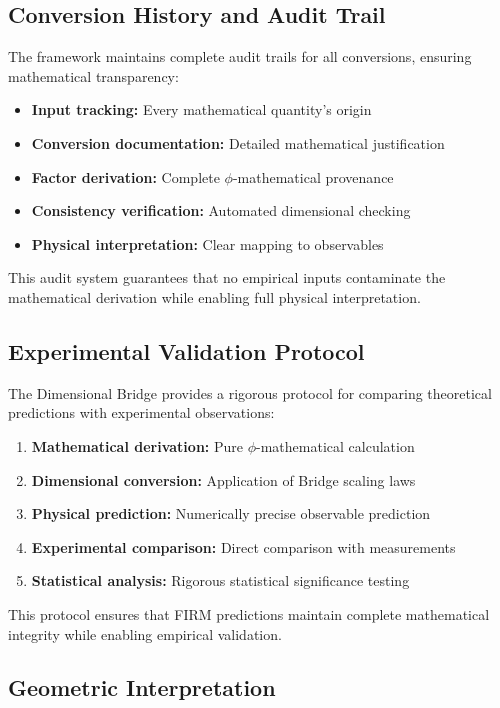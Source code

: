 \subsection{Conversion History and Audit Trail}

The framework maintains complete audit trails for all conversions, ensuring mathematical transparency:

\begin{itemize}
\item \textbf{Input tracking:} Every mathematical quantity's origin
\item \textbf{Conversion documentation:} Detailed mathematical justification
\item \textbf{Factor derivation:} Complete $\phi$-mathematical provenance
\item \textbf{Consistency verification:} Automated dimensional checking
\item \textbf{Physical interpretation:} Clear mapping to observables
\end{itemize}

This audit system guarantees that no empirical inputs contaminate the mathematical derivation while enabling full physical interpretation.

\subsection{Experimental Validation Protocol}

The Dimensional Bridge provides a rigorous protocol for comparing theoretical predictions with experimental observations:

\begin{enumerate}
\item \textbf{Mathematical derivation:} Pure $\phi$-mathematical calculation
\item \textbf{Dimensional conversion:} Application of Bridge scaling laws
\item \textbf{Physical prediction:} Numerically precise observable prediction
\item \textbf{Experimental comparison:} Direct comparison with measurements
\item \textbf{Statistical analysis:} Rigorous statistical significance testing
\end{enumerate}

This protocol ensures that FIRM predictions maintain complete mathematical integrity while enabling empirical validation.

\subsection{Geometric Interpretation}

